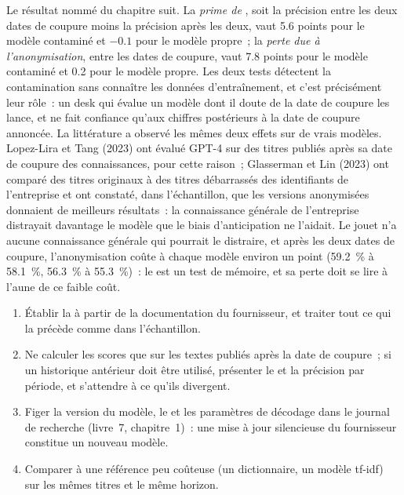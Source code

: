 Le résultat nommé du chapitre suit. La \emph{prime de }, soit la précision entre les deux dates de coupure moins la précision
après les deux, vaut 5.6 points pour le modèle contaminé et $-0.1$ pour le modèle propre~; la \emph{perte due à l'anonymisation}, entre les
dates de coupure, vaut 7.8 points pour le modèle contaminé et 0.2 pour le modèle propre. Les deux tests détectent la contamination sans
connaître les données d'entraînement, et c'est précisément leur rôle~: un desk qui évalue un modèle dont il doute de la date de coupure les lance, et
ne fait confiance qu'aux chiffres postérieurs à la date de coupure annoncée. La littérature a observé les mêmes deux effets sur de vrais modèles. Lopez-Lira et
Tang (2023) ont évalué GPT-4 sur des titres publiés après sa date de coupure des connaissances, pour cette raison~; Glasserman et Lin (2023)
ont comparé des titres originaux à des titres débarrassés des identifiants de l'entreprise et ont constaté, dans l'échantillon, que les versions anonymisées
donnaient de meilleurs résultats~: la connaissance générale de l'entreprise distrayait davantage le modèle que le biais d'anticipation ne l'aidait. Le jouet n'a aucune
connaissance générale qui pourrait le distraire, et après les deux dates de coupure, l'anonymisation coûte à chaque modèle environ un point (59.2~\% à 58.1~\%,
56.3~\% à 55.3~\%)~: le  est un test de mémoire, et sa perte doit se lire à l'aune de ce faible coût.

\begin{method}\label{met:ml:llm:method}
\begin{enumerate}
\item Établir la  à partir de la documentation du fournisseur, et traiter tout ce qui la précède comme dans l'échantillon.
\item Ne calculer les scores que sur les textes publiés après la date de coupure~; si un historique antérieur doit être utilisé, présenter le  et
la précision par période, et s'attendre à ce qu'ils divergent.
\item Figer la version du modèle, le  et les paramètres de décodage dans le journal de recherche (livre~7, chapitre~1)~: une
mise à jour silencieuse du fournisseur constitue un nouveau modèle.
\item Comparer à une référence peu coûteuse (un dictionnaire, un modèle tf-idf) sur les mêmes titres et le même horizon.
\end{enumerate}
\end{method}

